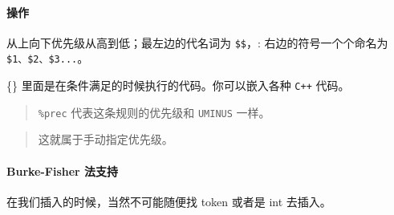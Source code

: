 \documentclass[
]{article}
\newenvironment{Shaded}{}{}
\newcommand{\BaseNTok}[1]{\textcolor[rgb]{0.25,0.63,0.44}{#1}}
\newcommand{\KeywordTok}[1]{\textcolor[rgb]{0.00,0.44,0.13}{\textbf{#1}}}
\newcommand{\NormalTok}[1]{#1}
\newcommand{\StringTok}[1]{\textcolor[rgb]{0.25,0.44,0.63}{#1}}
\begin{document}
\begin{Shaded}
\end{Shaded}

\hypertarget{header-n72}{%
\paragraph{操作}\label{header-n72}}

\begin{Shaded}
\end{Shaded}

从上向下优先级从高到低；最左边的代名词为 \texttt{\$\$}，:
右边的符号一个个命名为 \texttt{\$1、\$2、\$3...}。

\{\} 里面是在条件满足的时候执行的代码。你可以嵌入各种 \texttt{C++}
代码。

\begin{Shaded}
\end{Shaded}

\begin{quote}
\texttt{\%prec} 代表这条规则的优先级和 \texttt{UMINUS} 一样。
\end{quote}

\begin{quote}
这就属于手动指定优先级。
\end{quote}

\hypertarget{header-n81}{%
\paragraph{Burke-Fisher 法支持}\label{header-n81}}

在我们插入的时候，当然不可能随便找 token 或者是 int 去插入。
\end{document}
